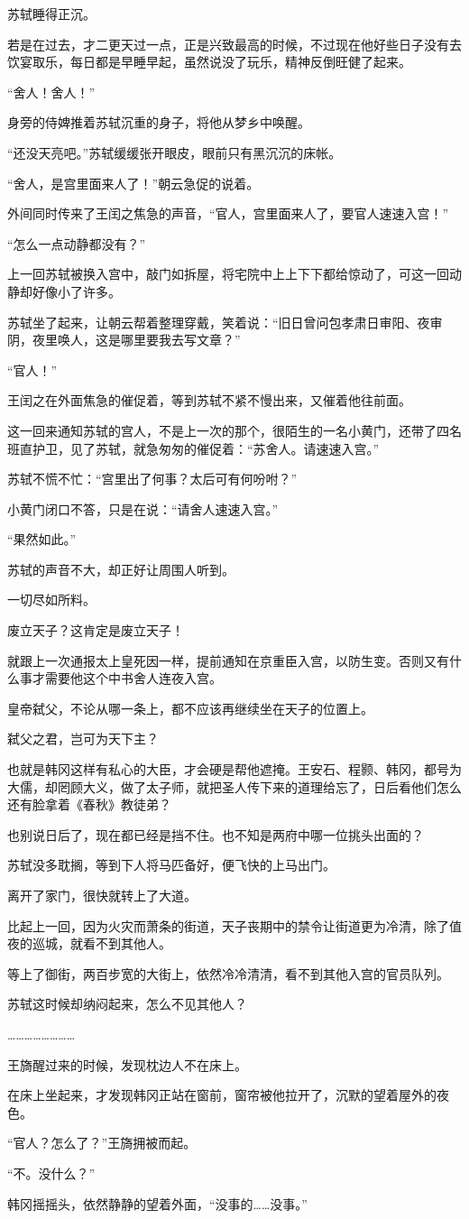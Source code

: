 苏轼睡得正沉。

若是在过去，才二更天过一点，正是兴致最高的时候，不过现在他好些日子没有去饮宴取乐，每日都是早睡早起，虽然说没了玩乐，精神反倒旺健了起来。

“舍人！舍人！”

身旁的侍婢推着苏轼沉重的身子，将他从梦乡中唤醒。

“还没天亮吧。”苏轼缓缓张开眼皮，眼前只有黑沉沉的床帐。

“舍人，是宫里面来人了！”朝云急促的说着。

外间同时传来了王闰之焦急的声音，“官人，宫里面来人了，要官人速速入宫！”

“怎么一点动静都没有？”

上一回苏轼被换入宫中，敲门如拆屋，将宅院中上上下下都给惊动了，可这一回动静却好像小了许多。

苏轼坐了起来，让朝云帮着整理穿戴，笑着说：“旧日曾问包孝肃日审阳、夜审阴，夜里唤人，这是哪里要我去写文章？”

“官人！”

王闰之在外面焦急的催促着，等到苏轼不紧不慢出来，又催着他往前面。

这一回来通知苏轼的宫人，不是上一次的那个，很陌生的一名小黄门，还带了四名班直护卫，见了苏轼，就急匆匆的催促着：“苏舍人。请速速入宫。”

苏轼不慌不忙：“宫里出了何事？太后可有何吩咐？”

小黄门闭口不答，只是在说：“请舍人速速入宫。”

“果然如此。”

苏轼的声音不大，却正好让周围人听到。

一切尽如所料。

废立天子？这肯定是废立天子！

就跟上一次通报太上皇死因一样，提前通知在京重臣入宫，以防生变。否则又有什么事才需要他这个中书舍人连夜入宫。

皇帝弑父，不论从哪一条上，都不应该再继续坐在天子的位置上。

弑父之君，岂可为天下主？

也就是韩冈这样有私心的大臣，才会硬是帮他遮掩。王安石、程颢、韩冈，都号为大儒，却罔顾大义，做了太子师，就把圣人传下来的道理给忘了，日后看他们怎么还有脸拿着《春秋》教徒弟？

也别说日后了，现在都已经是挡不住。也不知是两府中哪一位挑头出面的？

苏轼没多耽搁，等到下人将马匹备好，便飞快的上马出门。

离开了家门，很快就转上了大道。

比起上一回，因为火灾而萧条的街道，天子丧期中的禁令让街道更为冷清，除了值夜的巡城，就看不到其他人。

等上了御街，两百步宽的大街上，依然冷冷清清，看不到其他入宫的官员队列。

苏轼这时候却纳闷起来，怎么不见其他人？

……………………

王旖醒过来的时候，发现枕边人不在床上。

在床上坐起来，才发现韩冈正站在窗前，窗帘被他拉开了，沉默的望着屋外的夜色。

“官人？怎么了？”王旖拥被而起。

“不。没什么？”

韩冈摇摇头，依然静静的望着外面，“没事的……没事。”

